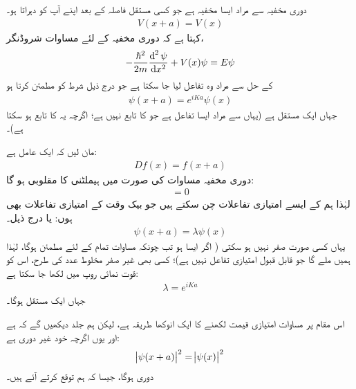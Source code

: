 دوری مخفیہ سے مراد ایسا مخفیہ ہے جو کسی مستقل فاصلہ  کے بعد اپنے آپ کو دہراتا ہو۔ 
\begin{align}\label{مساوات_متماثل_دوری_مخفیہ_کنگھی}
	V(x+a) = V(x)
\end{align}
 کہتا ہے کہ دوری مخفیہ کے لئے مساوات شروڈنگر،
\begin{align}
	-\frac{\hslash^{2}}{2m}\frac{\dif^{\,2}\psi}{\dif x^{2}} +V(x)\psi = E\psi
\end{align}
کے حل سے مراد وہ تفاعل لیا جا سکتا ہے جو درج ذیل شرط کو مطمئن کرتا ہو
\begin{align}\label{مساوات_متماثل_اگلا}
	\psi(x+a) = e^{iKa}\psi(x)
\end{align}
جہاں  ایک مستقل ہے (یہاں  سے مراد ایسا تفاعل ہے جو  کا تابع نہیں ہے؛ اگرچہ یہ  کا تابع ہو سکتا ہے)۔

 مان لیں کہ  ایک عامل ہے:
\begin{align}
	Df(x) = f(x+a)
\end{align}
دوری مخفیہ مساوات  کی صورت میں  ہیملٹنی کا مقلوبی ہو گا:
\begin{align}
	[D, H] = 0
\end{align}
لہٰذا ہم  کے ایسے امتیازی تفاعلات چن سکتے ہیں جو بیک وقت  کے امتیازی تفاعلات بھی ہوں: یا درج ذیل۔
\begin{align}\label{مساوات_متماثل_دوری_تفاعل_الف}
	\psi(x+a) = \lambda\psi(x)
\end{align}
یہاں  کسی صورت صفر نہیں ہو سکتی ( اگر ایسا ہو تب چونکہ مساوات  تمام  کے لئے مطمئن ہوگا، لہٰذا ہمیں  ملے گا جو قابل قبول امتیازی تفاعل نہیں ہے)؛ کسی بھی غیر صفر مخلوط عدد کی طرح، اس کو قوت نمائی روپ میں لکھا جا سکتا ہے: 
\begin{align}\label{مساوت_متماثل_قوت_نما_مستقل}
	\lambda = e^{iKa}
\end{align}
جہاں  ایک مستقل ہوگا۔

اس مقام پر مساوات  امتیازی قیمت  لکھنے کا ایک انوکھا طریقہ ہے، لیکن ہم جلد دیکھیں گے کہ  ہے اور یوں اگرچہ  خود غیر دوری ہے:
\begin{align}\label{مساوات_متماثل_آخری_مقام_تفاعل_ابتدائی}
	\abs{\psi(x+a)}^{2} = \abs{\psi(x)}^{2}
\end{align}
دوری ہوگا، جیسا کہ ہم توقع کرتے آئے ہیں۔


